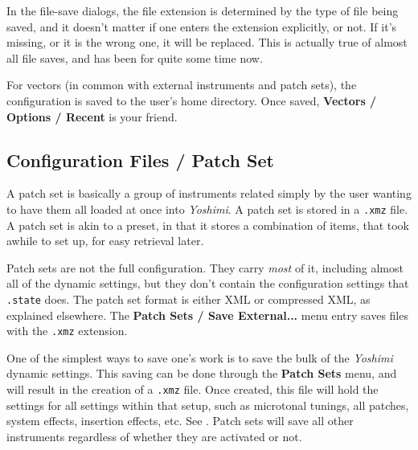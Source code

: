    In the file-save dialogs, the file extension is determined by the type of
   file being saved, and it doesn't matter if one enters the extension
   explicitly, or not. If it's missing, or it is the wrong one, it will be
   replaced. This is actually true of almost all file saves, and has been for
   quite some time now.

   For vectors (in common with external instruments and patch sets),
   the configuration is saved to the user's home directory.
   Once saved, \textbf{Vectors / Options / Recent} is your friend.


\subsection{Configuration Files / Patch Set}
\label{subsec:configuration_patch_set}

   A patch set is basically a group of instruments related simply by the user
   wanting to have them all loaded at once into \textsl{Yoshimi}.  A patch set
   is stored in a \texttt{.xmz} file.  A patch set is akin to a preset, in that
   it stores a combination of items, that took awhile to set up, for easy
   retrieval later.

   Patch sets are not the full configuration. They carry \textsl{most} of it,
   including almost all of the dynamic settings, but they don't contain the
   configuration settings that \texttt{.state} does.  The patch set format is
   either XML or compressed XML, as explained elsewhere.  The
   \textbf{Patch Sets / Save External...} menu entry saves files with
   the \texttt{.xmz} extension.

   One of the simplest ways to save one's work is to save the bulk of the
\textsl{Yoshimi} dynamic settings.
   This saving can be done through the \textbf{Patch Sets} menu,
   and will result in the creation of
   a \texttt{.xmz} file. Once created, this file will hold the settings for
   all settings within that setup, such as microtonal tunings, all
   patches, system effects, insertion effects, etc.
   See .
   Patch sets will save all other instruments regardless of whether they are
   activated or not.

